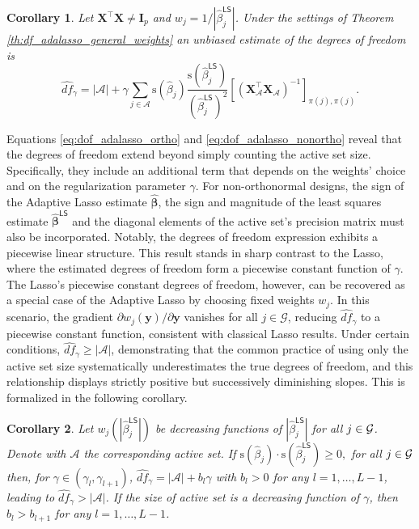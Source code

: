 \documentclass[a4paper, 12pt]{article}
\newcommand{\R}{\mathbb{R}}
\newcommand{\Aset}{\mathcal{A}}
\newcommand{\sgn}{\mathrm{s}}
\newcommand{\betahat}{\widehat{\boldsymbol\beta}}
\newcommand{\T}{\top}
\def\by{\boldsymbol{y}}
\def\bI{\mathbf{I}}
\def\bX{\mathbf{X}}
\def\by{\mathbf{y}}
\newtheorem{corollary}{Corollary}
\begin{document}
\begin{corollary}
\label{th:df_adalasso_nonortho}
    Let $\bX^{\T}\bX\neq \bI_p$ and $w_j = 1/|\widehat{\beta}_j^{\mathsf{LS}}|$. Under the settings of Theorem \ref{th:df_adalasso_general_weights} an unbiased estimate of the degrees of freedom is
\begin{equation} 
\label{eq:dof_adalasso_nonortho}
\widehat{df}_\gamma=\vert\Aset\vert+\gamma\sum_{j\in\Aset} \sgn(\widehat{\beta}_{j}) \frac{ \sgn(\widehat{\beta}_j^{\mathsf{LS}})}{(\widehat{\beta}_j^{\mathsf{LS}})^2} [(\bX_{\Aset}^{\T} \bX_{\Aset} )^{-1}]_{\pi(j),\pi(j)}.
\end{equation}
\end{corollary}
%
\noindent Equations 
\eqref{eq:dof_adalasso_ortho} and \eqref{eq:dof_adalasso_nonortho} reveal that the degrees of freedom extend beyond simply counting the active set size. Specifically, they include an additional term that depends on the weights' choice and on the regularization parameter $\gamma$. For non-orthonormal designs, the sign of the Adaptive Lasso estimate $\betahat$, the sign and magnitude of the least squares estimate $\betahat^{\mathsf{LS}}$ and the diagonal elements of the active set's precision matrix must also be incorporated. 
%
Notably, the degrees of freedom expression exhibits a piecewise linear structure. This result stands in sharp contrast to the Lasso, where the estimated degrees of freedom form a piecewise constant function of $\gamma$. The Lasso’s piecewise constant degrees of freedom, however, can be recovered as a special case of the Adaptive Lasso by choosing fixed weights $w_j$. In this scenario, the gradient $\partial w_j(\by)/\partial \by$ vanishes for all $j \in \mathcal{G}$, reducing $\widehat{{df}}_\gamma$ to a piecewise constant function, consistent with classical Lasso results. Under certain conditions, $\widehat{{df}}_\gamma \geq |\mathcal{A}|$, demonstrating that the common practice of using only the active set size systematically underestimates the true degrees of freedom, and this relationship displays strictly positive but successively diminishing slopes. This is formalized in the following corollary.
\begin{corollary}
\label{coro:linearincreasing}
Let $w_j(|\widehat{\beta}_j^\mathsf{LS}|)$ be decreasing functions of $|\widehat{\beta}_j^\mathsf{LS}|$ for all $j\in \cal G$. Denote with $\Aset$ the corresponding active set. If $\sgn{(\widehat{\beta}_j)} \cdot \sgn{(\widehat{\beta}_j^\mathsf{LS})} \geq 0,$  for all $j\in \cal G$ then, for $\gamma \in (\gamma_l, \gamma_{l+1})$, %
$\widehat{df}_\gamma = |\Aset| + b_l \gamma$ with $b_l >0$ for any $l = 1, \dots, L-1$, leading to $\widehat{df}_\gamma > |\Aset|$. If the size of active set is a decreasing function of $\gamma$, then $b_l > b_{l+1}$ for any $l=1,\ldots, L-1$.
\end{corollary}
\end{document}

